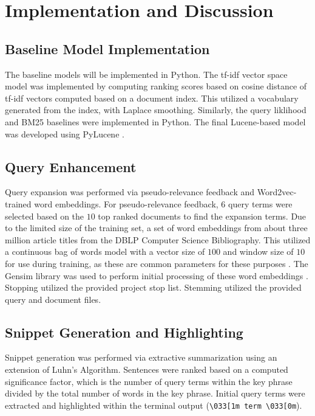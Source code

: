 \documentclass[conference]{IEEEtran}
\begin{document}
\section{Implementation and Discussion}
\subsection{Baseline Model Implementation}
The baseline models will be implemented in Python. The tf-idf vector space model was implemented by computing ranking scores based on cosine distance of tf-idf vectors computed based on a document index. This utilized a vocabulary generated from the index, with Laplace smoothing. Similarly, the query liklihood and BM25 baselines were implemented in Python. The final Lucene-based model was developed using PyLucene \cite{vajda2005pulling}.

\subsection{Query Enhancement}
Query expansion was performed via pseudo-relevance feedback and Word2vec-trained \cite{mikolov2015computing} word embeddings. For pseudo-relevance feedback, $6$ query terms were selected based on the $10$ top ranked documents to find the expansion terms. Due to the limited size of the training set, a set of word embeddings from about three million article titles from the DBLP Computer Science Bibliography. This utilized a continuous bag of words model with a vector size of $100$ and window size of $10$ for use during training, as these are common parameters for these purposes \cite{mikolov2013distributed}. The Gensim library was used to perform initial processing of these word embeddings \cite{rehurek_lrec}. Stopping utilized the provided project stop list. Stemming utilized the provided query and document files.

\subsection{Snippet Generation and Highlighting}
Snippet generation was performed via extractive summarization using an extension of Luhn's Algorithm. Sentences were ranked based on a computed significance factor, which is the number of query terms within the key phrase divided by the total number of words in the key phrase. Initial query terms were extracted and highlighted within the terminal output (\verb|\033[1m term \033[0m|).
\end{document}
